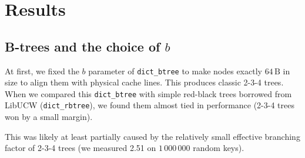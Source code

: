 \chapter{Results}
\label{chapter:results}

\section{\mbox{B-trees} and the choice of $b$}
At first, we fixed the $b$ parameter of \texttt{dict\_btree} to make nodes
exactly $64\,\text{B}$ in size to align them with physical cache lines.
This produces classic 2-3-4 trees. When we compared this \texttt{dict\_btree}
with simple red-black trees borrowed from LibUCW (\texttt{dict\_rbtree}),
we found them almost tied in performance (2-3-4 trees won by a small margin).

This was likely at least partially caused by the relatively small effective
branching factor of 2-3-4 trees (we measured 2.51 on $1\,000\,000$ random
keys).

